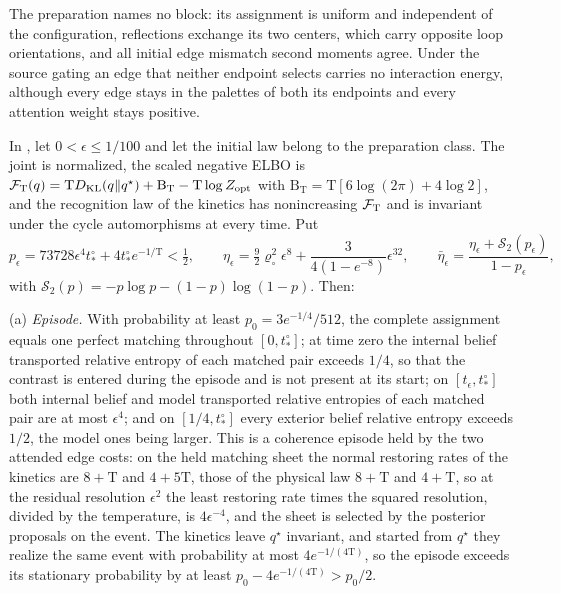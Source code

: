 The preparation names no block: its assignment is uniform and independent of
the configuration, reflections exchange its two centers, which carry opposite
loop orientations, and all initial edge mismatch second moments agree. Under
the source gating an edge that neither endpoint selects carries no
interaction energy, although every edge stays in the palettes of both its endpoints and every
attention weight stays positive.

In , let \(0<\epsilon\le1/100\) and let
the initial law belong to the preparation class. The joint is normalized, the
scaled negative ELBO is
\(\mathcal F_{\mathrm T}(q)=\mathrm TD_{\mathrm{KL}}(q\Vert q^\star)+\mathrm B_{\mathrm T}
-\mathrm T\log Z_{\mathrm{opt}}\) with
\(\mathrm B_{\mathrm T}=\mathrm T[6\log(2\pi)+4\log2]\), and the recognition law
of the kinetics has nonincreasing \(\mathcal F_{\mathrm T}\) and is invariant
under the cycle automorphisms at every time. Put
\begin{equation}
p_\epsilon=73728 \epsilon^4t^\circ_*+4t^\circ_*e^{-1/\mathrm T}<\tfrac12,
\qquad
\eta_\epsilon=\tfrac92\varrho_\circ^2\epsilon^8+\frac{3}{4(1-e^{-8})}\epsilon^{32},
\qquad
\bar\eta_\epsilon=\frac{\eta_\epsilon+\mathcal S_2(p_\epsilon)}{1-p_\epsilon},
\label{eq:rg-formation-cycle-constants}
\end{equation}
with \(\mathcal S_2(p)=-p\log p-(1-p)\log(1-p)\). Then:

(a) \emph{Episode.} With probability at least
\(p_0=3e^{-1/4}/512\), the complete assignment equals one perfect matching
throughout \([0,t^\circ_*]\); at time zero the internal belief transported
relative entropy of each matched pair exceeds \(1/4\), so that the contrast is
entered during the episode and is not present at its start; on
\([t_\epsilon,t^\circ_*]\) both internal belief and model transported relative
entropies of each matched pair are at most \(\epsilon^4\); and on
\([1/4,t^\circ_*]\) every exterior belief relative entropy exceeds \(1/2\), the
model ones being larger. This is a coherence episode held by the two attended
edge costs: on the held matching sheet the normal restoring rates of the
kinetics are \(8+\mathrm T\) and \(4+5\mathrm T\), those of the physical law
\(8+\mathrm T\) and \(4+\mathrm T\), so at the residual resolution
\(\epsilon^2\) the least restoring rate times the squared resolution, divided
by the temperature, is \(4\epsilon^{-4}\), and the sheet is selected by the
posterior proposals on the event. The kinetics leave \(q^\star\) invariant,
and started from \(q^\star\) they realize the same event with probability at
most \(4e^{-1/(4\mathrm T)}\), so the episode exceeds its stationary
probability by at least \(p_0-4e^{-1/(4\mathrm T)}>p_0/2\).

